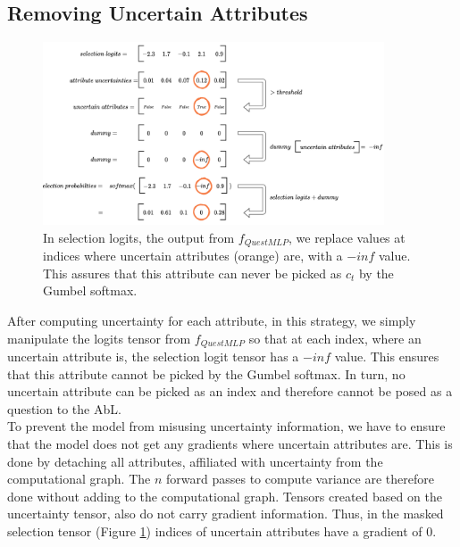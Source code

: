 \documentclass[a4paper,cleardoubleempty,BCOR1cm, 11pt]{report}
\begin{document}
\subsection{Removing Uncertain Attributes}\label{sec:remRDTC}
\begin{figure}
	\centering
	\includegraphics[width=0.9\textwidth]{images/remove_attrs.pdf} 
	\caption{In selection logits, the output from $f_{QuestMLP}$, we replace values at indices where uncertain attributes (orange) are, with a $-inf$ value. This assures that this attribute can never be picked as $c_t$ by the Gumbel softmax.}
	\label{fig:remove_intuition}
\end{figure}

After computing uncertainty for each attribute, in this strategy, we simply manipulate the logits tensor from $f_{QuestMLP}$ so that at each index, where an uncertain attribute is, the selection logit tensor has a $-inf$ value. This ensures that this attribute cannot be picked by the Gumbel softmax. In turn, no uncertain attribute can be picked as an index and therefore cannot be posed as a question to the AbL.\\
To prevent the model from misusing uncertainty information, we have to ensure that the model does not get any gradients where uncertain attributes are. This is done by detaching all attributes, affiliated with uncertainty from the computational graph. The $n$ forward passes to compute variance are therefore done without adding to the computational graph. Tensors created based on the uncertainty tensor, also do not carry gradient information. Thus, in the masked selection tensor (Figure \ref{fig:remove_intuition}) indices of uncertain attributes have a gradient of $0$.
\end{document}
